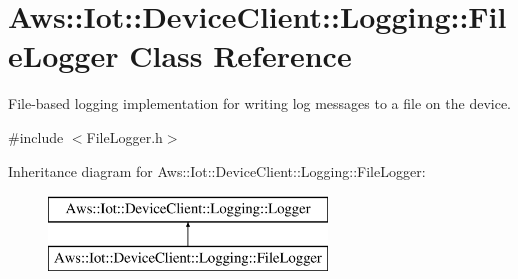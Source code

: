 \hypertarget{class_aws_1_1_iot_1_1_device_client_1_1_logging_1_1_file_logger}{}\section{Aws\+:\+:Iot\+:\+:Device\+Client\+:\+:Logging\+:\+:File\+Logger Class Reference}
\label{class_aws_1_1_iot_1_1_device_client_1_1_logging_1_1_file_logger}


File-\/based logging implementation for writing log messages to a file on the device.  




{\ttfamily \#include $<$File\+Logger.\+h$>$}

Inheritance diagram for Aws\+:\+:Iot\+:\+:Device\+Client\+:\+:Logging\+:\+:File\+Logger\+:\begin{figure}[H]
\begin{center}
\leavevmode
\includegraphics[height=2.000000cm]{class_aws_1_1_iot_1_1_device_client_1_1_logging_1_1_file_logger}
\end{center}
\end{figure}
